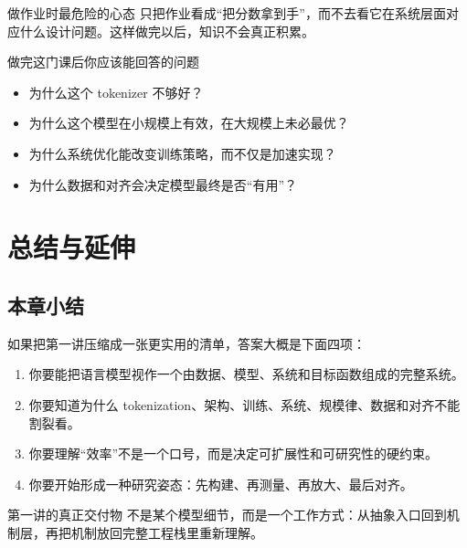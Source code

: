 \documentclass[a4paper]{article}
\begin{document}
\begin{warningbox}{做作业时最危险的心态}
只把作业看成“把分数拿到手”，而不去看它在系统层面对应什么设计问题。这样做完以后，知识不会真正积累。
\end{warningbox}

\begin{knowledgebox}{做完这门课后你应该能回答的问题}
\begin{itemize}
    \item 为什么这个 tokenizer 不够好？
    \item 为什么这个模型在小规模上有效，在大规模上未必最优？
    \item 为什么系统优化能改变训练策略，而不仅是加速实现？
    \item 为什么数据和对齐会决定模型最终是否“有用”？
\end{itemize}
\end{knowledgebox}

\section{总结与延伸}

\subsection{本章小结}

如果把第一讲压缩成一张更实用的清单，答案大概是下面四项：
\begin{enumerate}
    \item 你要能把语言模型视作一个由数据、模型、系统和目标函数组成的完整系统。
    \item 你要知道为什么 tokenization、架构、训练、系统、规模律、数据和对齐不能割裂看。
    \item 你要理解“效率”不是一个口号，而是决定可扩展性和可研究性的硬约束。
    \item 你要开始形成一种研究姿态：先构建、再测量、再放大、最后对齐。
\end{enumerate}

\begin{importantbox}{第一讲的真正交付物}
不是某个模型细节，而是一个工作方式：从抽象入口回到机制层，再把机制放回完整工程栈里重新理解。
\end{importantbox}
\end{document}
